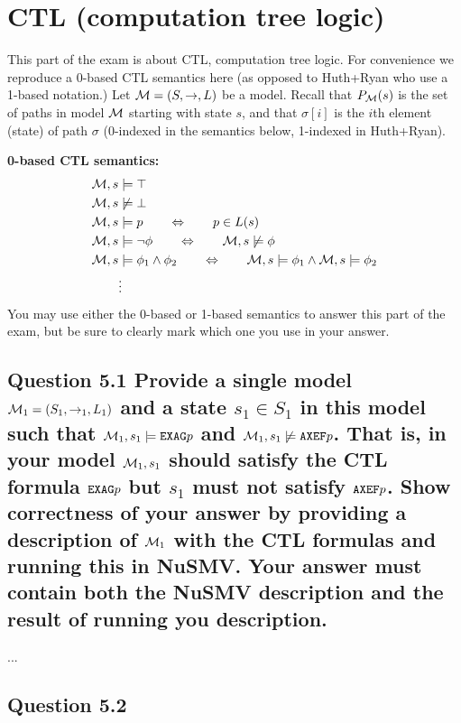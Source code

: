 \section{CTL (computation tree logic)}
This part of the exam is about CTL, computation tree logic. For convenience
we reproduce a 0-based CTL semantics here (as opposed to Huth+Ryan who use a
1-based notation.) Let ${\cal M} = (S,\to,L)$ be a model. Recall that
$P_{\cal M}(s)$ is the set of paths in model ${\cal M}$ starting with state
$s$, and that $\sigma[i]$ is the $i$th element (state) of path $\sigma$
(0-indexed in the semantics below, 1-indexed in Huth+Ryan).

{\bf 0-based CTL semantics:}
\begin{align*}
	{\cal M}, s &\models \top \\
	{\cal M}, s &\not\models \bot \\
	{\cal M}, s &\models p \qquad\Leftrightarrow\qquad p \in L(s) \\
	{\cal M}, s &\models \neg\phi \qquad\Leftrightarrow\qquad
		{\cal M}, s \not\models \phi \\
	{\cal M}, s &\models \phi_1 \land \phi_2 \qquad\Leftrightarrow\qquad
		{\cal M}, s \models \phi_1 \land {\cal M}, s \models \phi_2 \\
	&\vdots
\end{align*}
You may use either the 0-based or 1-based semantics to answer this part of the
exam, but be sure to clearly mark which one you use in your answer.

\subsection*{Question 5.1 \mdseries Provide a single model ${\cal M}_1 =
(S_1, \to_1, L_1)$ and a state $s_1 \in S_1$ in this model such that
${\cal M}_1, s_1 \models \text{\tt EXAG} p$ and ${\cal M}_1, s_1 \not\models
\text{\tt AXEF} p$. That is, in your model ${\cal M}_1, s_1$ should satisfy
the CTL formula $\text{\tt EXAG} p$ but $s_1$ must not satisfy
$\text{\tt AXEF} p$. \newline\indent
Show correctness of your answer by providing a description of ${\cal M}_1$
with the CTL formulas and running this in NuSMV. Your answer must contain both
the NuSMV description and the result of running you description.}
...

\subsection*{Question 5.2}

